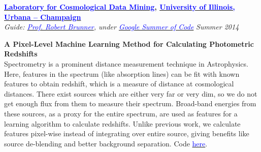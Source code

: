 \documentclass[margin,line]{res}
\newenvironment{list1}{
  \begin{list}{\ding{113}}{%
      \setlength{\itemsep}{0in}
      \setlength{\parsep}{0in} \setlength{\parskip}{0in}
      \setlength{\topsep}{0in} \setlength{\partopsep}{0in} 
      \setlength{\leftmargin}{0.17in}}}{\end{list}}
\begin{document}
\begin{resume}
{\bf \href{http://lcdm.astro.illinois.edu/}{\textcolor{blue} {Laboratory for Cosmological Data Mining}}, \href{http://www.illinois.edu/}{\textcolor{blue}{University of Illinois, Urbana -- Champaign}}} \\
{\em Guide: \href{http://www.astro.illinois.edu/people/bigdog}{\textcolor{blue}{Prof. Robert Brunner}}, under \href{https://www.google-melange.com/gsoc/homepage/google/gsoc2014}{\textcolor{blue} {Google Summer of Code}}} \hfill {\it Summer 2014} \\
\vspace*{-.13in}
\begin{list1}
\item[]\textbf{A Pixel-Level Machine Learning Method for Calculating Photometric Redshifts} \\
Spectrometry is a prominent distance measurement technique in Astrophysics. Here, features in the spectrum (like absorption lines) can be fit with known features to obtain redshift, which is a measure of distance at cosmological distances. There exist sources which are either very far or very dim, so we do not get enough flux from them to measure their spectrum. Broad-band energies from these sources, as a proxy for the entire spectrum, are used as features for a learning algorithm to calculate redshifts. Unlike previous work, we calculate features pixel-wise instead of integrating over entire source, giving benefits like source de-blending and better background separation. Code \href{https://github.com/alankarkotwal/image-photo-z/}{\textcolor{blue} {here}}.
\end{list1}


\end{resume}
\end{document}
